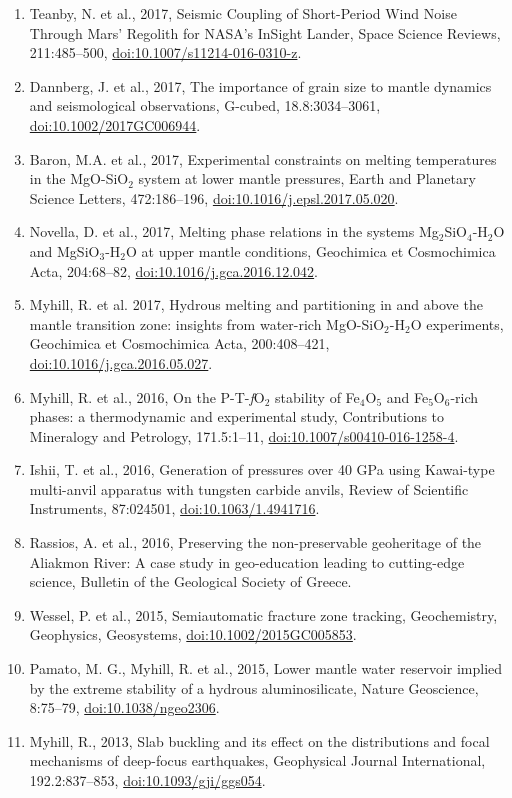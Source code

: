 \documentclass[11pt,twoside,a4paper]{article}
\newcommand{\doi}[1]{\href{http://dx.doi.org/#1}{doi:#1}}
\begin{document}
\begin{enumerate}
\item Teanby, N. et al., 2017, Seismic Coupling of Short-Period Wind Noise Through Mars' Regolith for NASA's InSight Lander, Space Science Reviews, 211:485--500, \doi{10.1007/s11214-016-0310-z}.
\item Dannberg, J. et al., 2017, The importance of grain size to mantle dynamics and seismological observations, G-cubed, 18.8:3034--3061, \doi{10.1002/2017GC006944}.
\item Baron, M.A. et al., 2017, Experimental constraints on melting temperatures in the MgO-SiO$_2$ system at lower mantle pressures, Earth and Planetary Science Letters, 472:186--196, \doi{10.1016/j.epsl.2017.05.020}.
\item Novella, D. et al., 2017, Melting phase relations in the systems Mg$_2$SiO$_4$-H$_2$O and MgSiO$_3$-H$_2$O at upper mantle conditions, Geochimica et Cosmochimica Acta, 204:68--82, \doi{10.1016/j.gca.2016.12.042}.
\item Myhill, R. et al. 2017, Hydrous melting and partitioning in and above the mantle transition zone: insights from water-rich MgO-SiO$_2$-H$_2$O experiments, Geochimica et Cosmochimica Acta, 200:408--421, \doi{10.1016/j.gca.2016.05.027}.
\item Myhill, R. et al., 2016, On the P-T-\emph{f}O$_2$ stability of Fe$_4$O$_5$ and Fe$_5$O$_6$-rich phases: a thermodynamic and experimental study, Contributions to Mineralogy and Petrology, 171.5:1--11, \doi{10.1007/s00410-016-1258-4}.
 \item Ishii, T. et al., 2016, Generation of pressures over 40 GPa using Kawai-type multi-anvil apparatus with tungsten carbide anvils, Review of Scientific Instruments, 87:024501, \doi{10.1063/1.4941716}.
 \item Rassios, A. et al., 2016, Preserving the non-preservable geoheritage of the Aliakmon River: A case study in geo-education leading to cutting-edge science, Bulletin of the Geological Society of Greece.
\item  Wessel, P. et al., 2015, Semiautomatic fracture zone tracking, Geochemistry, Geophysics, Geosystems, \doi{10.1002/2015GC005853}.
\item Pamato, M. G., Myhill, R. et al., 2015, Lower mantle water reservoir implied by the extreme stability of a hydrous aluminosilicate, Nature Geoscience, 8:75--79, \doi{10.1038/ngeo2306}.
\item Myhill, R., 2013, Slab buckling and its effect on the distributions and focal mechanisms of deep-focus earthquakes, Geophysical Journal International, 192.2:837--853, \doi{10.1093/gji/ggs054}.

\end{enumerate}
\end{document}
